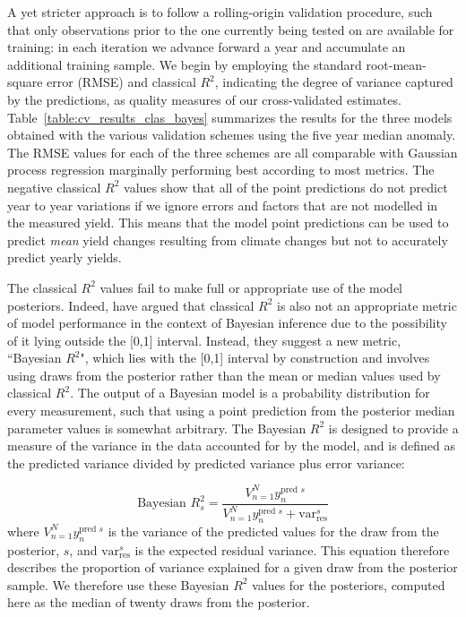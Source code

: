 \documentclass[12pt]{iopart}
\newcommand{\remove}[1]{}
\newcommand{\add}[1]{#1}
\begin{document}
A yet stricter approach is to follow a rolling-origin validation procedure, such that only observations prior to the one currently being tested on are available for training: in each iteration we advance forward a year and accumulate an additional training sample. We begin by employing the standard root-mean-square error (RMSE) and classical $R^2$, indicating the degree of variance captured by the predictions, as quality measures of our cross-validated estimates. Table~\ref{table:cv_results_clas_bayes} summarizes the results for the three models obtained with the various validation schemes \add{using the five year median anomaly}. The RMSE values for each of the three schemes are all comparable with Gaussian process regression marginally performing best according to most metrics. The negative classical $R^2$ values show that all of the \remove{methods}\add{point predictions} do not\remove{ well} predict year to year variations if we ignore errors and factors that are not modelled in the measured yield. This means that the model \add{point predictions} can be used to predict \emph{mean} yield changes resulting from climate changes but not to accurately predict yearly yields.

The classical $R^2$ values fail to make full or appropriate use of the model posteriors. Indeed, \citet{Gelman:2019} have argued that \add{classical} $R^2$ is also not an appropriate metric of model performance in the context of Bayesian inference due to the possibility of it lying outside the [0,1] interval. Instead, they suggest a new metric, ``Bayesian $R^2$", which lies with the [0,1] interval by construction and involves using draws from the posterior rather than the mean or median values used by classical $R^2$.  \add{The output of a Bayesian model is a probability distribution for every measurement, such that using a point prediction from the posterior median parameter values is somewhat arbitrary.} The Bayesian $R^2$ is designed to provide a measure of the variance in the data accounted for by the model, and is defined as the predicted variance divided by predicted variance plus error variance:

\begin{equation}
\label{eq}
\textrm{Bayesian } R^2_s = \frac{V^N_{n=1} y_n^{\textrm{pred } s} }{V^N_{n=1} y_n^{\textrm{pred } s}  + \textrm{var}^s_{\textrm{res}}}
\end{equation}
where $V^N_{n=1} y_n^{\textrm{pred } s}$ is the variance of the predicted values for the draw from the posterior, $s$, and $\textrm{var}^s_{\textrm{res}}$ is the expected residual variance. This equation therefore describes the proportion of variance explained for a given draw from the posterior sample. We therefore \remove{provide}\add{use these} Bayesian $R^2$ values for the posteriors, computed here as the median of twenty draws from the posterior. \remove{These $R^2$ values arguably provide a superior method for evaluating model performance in terms of observed variance that is accounted for. }
\end{document}
